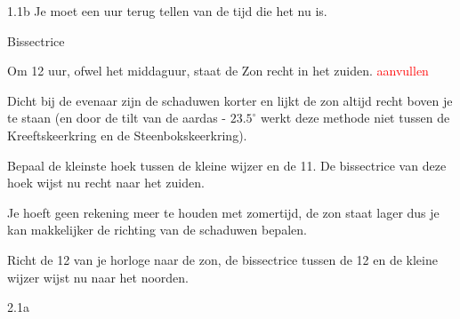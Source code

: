 \begin{Antwoord}{1.1b}
            Je moet een uur terug tellen van de tijd die het nu is.
        
\end{Antwoord}
\begin{Antwoord}{1.3}
         Bissectrice
    
\end{Antwoord}
\begin{Antwoord}{1.5}
        Om 12 uur, ofwel het middaguur, staat de Zon recht in het zuiden. \textcolor{red}{aanvullen}
    
\end{Antwoord}
\begin{Antwoord}{1.6}
        Dicht bij de evenaar zijn de schaduwen korter en lijkt de zon altijd recht boven je te staan (en door de tilt van de aardas - $23.5^{\circ}$ werkt deze methode niet tussen de Kreeftskeerkring en de Steenbokskeerkring).
    
\end{Antwoord}
\begin{Antwoord}{1.7}
        Bepaal de kleinste hoek tussen de kleine wijzer en de 11. De bissectrice van deze hoek wijst nu recht naar het zuiden.
    
\end{Antwoord}
\begin{Antwoord}{1.8}
        Je hoeft geen rekening meer te houden met zomertijd, de zon staat lager dus je kan makkelijker de richting van de schaduwen bepalen.
    
\end{Antwoord}
\begin{Antwoord}{1.10}
        Richt de 12 van je horloge naar de zon, de bissectrice tussen de 12 en de kleine wijzer wijst nu naar het noorden.
    
\end{Antwoord}
\begin{Antwoord}{2.1a}
		
\end{Antwoord}
